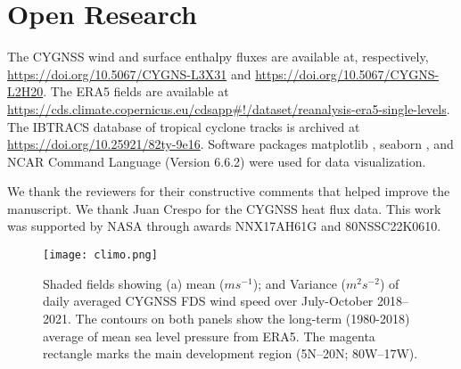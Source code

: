 \documentclass[draft]{agujournal2019}
\begin{document}
%
%

%

\section{Open Research}
The CYGNSS wind and surface enthalpy fluxes are available at, respectively, \url{https://doi.org/10.5067/CYGNS-L3X31} and  \url{https://doi.org/10.5067/CYGNS-L2H20}. The ERA5 fields are available at  \url{https://cds.climate.copernicus.eu/cdsapp#!/dataset/reanalysis-era5-single-levels}. The IBTRACS database of tropical cyclone tracks is archived at \url{https://doi.org/10.25921/82ty-9e16}. Software packages matplotlib \cite{Hunter:2007}, seaborn \cite{Waskom2021}, and NCAR Command Language (Version 6.6.2) were used for data visualization.


\acknowledgments
We thank the reviewers for their constructive comments that helped improve the manuscript. We thank Juan Crespo for the CYGNSS heat flux data. This work was supported by NASA through awards NNX17AH61G and 80NSSC22K0610.


\newpage


\begin{figure}
 \texttt{[image: climo.png]}
 \caption{Shaded fields showing (a) mean ($ms^{-1}$); and   Variance ($m^{2}s^{-2}$)  of daily averaged CYGNSS FDS wind speed over July-October 2018--2021. The contours on both panels show the long-term (1980-2018) average of mean sea level pressure from ERA5. The magenta rectangle marks the main development region (5N--20N; 80W--17W).}
 \label{fig:climo}
\end{figure}
\end{document}
